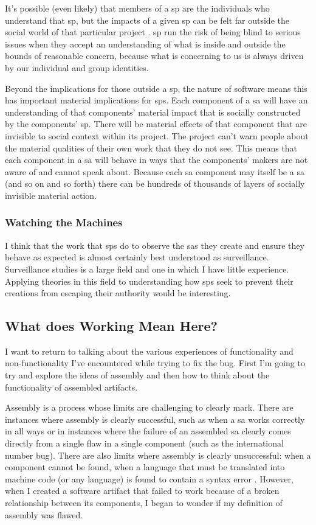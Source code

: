 \documentclass[a4paper,man,natbib,floatsintext]{apa6}
\begin{document}
   It's possible (even likely) that members of a \gls{sp} are the individuals who understand that \gls{sp}, but the impacts of a given \gls{sp} can be felt far outside the social world of that particular project \citep{Kitchin2011-af}. \Gls{sp} run the risk of being blind to serious issues when they accept an understanding of what is inside and outside the bounds of reasonable concern, because what is concerning to us is always driven by our individual and group identities.

   Beyond the implications for those outside a \gls{sp}, the nature of software means this has important material implications for \glspl{sp}. Each component of a \gls{sa} will have an understanding of that components' material impact that is socially constructed by the components' \gls{sp}. There will be material effects of that component that are invisible to social context within its project. The project can't warn people about the material qualities of their own work that they do not see. This means that each component in a \gls{sa} will behave in ways that the components' makers are not aware of and cannot speak about. Because each \gls{sa} component may itself be a \gls{sa} (and so on and so forth) there can be hundreds of thousands of layers of socially invisible material action.

   \subsubsection{Watching the Machines}
   I think that the work that \glspl{sp} do to observe the \glspl{sa} they create and ensure they behave as expected is almost certainly best understood as surveillance. Surveillance studies is a large field and one in which I have little experience. Applying theories in this field to understanding how \glspl{sp} seek to prevent their creations from escaping their authority would be interesting.

   \subsection{What does Working Mean Here?}
   I want to return to talking about the various experiences of functionality and non-functionality I've encountered while trying to fix the bug. First I'm going to try and explore the ideas of assembly and then how to think about the functionality of assembled artifacts.

   Assembly is a process whose limits are challenging to clearly mark. There are instances where assembly is clearly successful, such as when a \gls{sa} works correctly in all ways or in instances where the failure of an assembled \gls{sa} clearly comes directly from a single flaw in a single component (such as the international number bug). There are also limits where assembly is clearly unsuccessful: when a component cannot be found, when a language that must be translated into machine code (or any language) is found to contain a syntax error \citep{Cramer2008-cw}. However, when I created a software artifact that failed to work because of a broken relationship between its components, I began to wonder if my definition of assembly was flawed.
\end{document}
